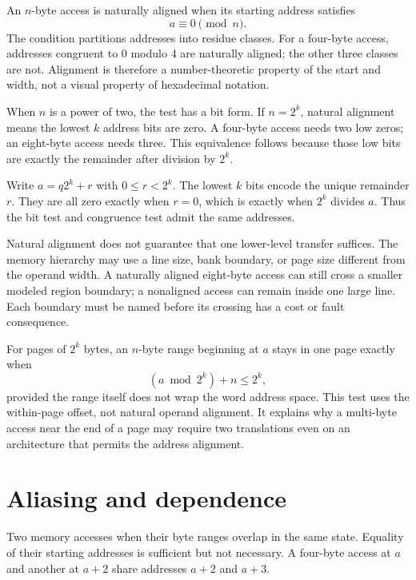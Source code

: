 An \(n\)-byte access is naturally aligned when its starting address satisfies
\[
 a\equiv0\pmod n.
\]
The condition partitions addresses into residue classes. For a four-byte
access, addresses congruent to 0 modulo 4 are naturally aligned; the other
three classes are not. Alignment is therefore a number-theoretic property of
the start and width, not a visual property of hexadecimal notation.

When \(n\) is a power of two, the test has a bit form. If \(n=2^k\), natural
alignment means the lowest \(k\) address bits are zero. A four-byte access
needs two low zeros; an eight-byte access needs three. This equivalence follows
because those low bits are exactly the remainder after division by \(2^k\).

\begin{proofkit}[title={Low zero bits characterize power-of-two alignment}]
Write \(a=q2^k+r\) with \(0\leq r<2^k\). The lowest \(k\) bits encode the
unique remainder \(r\). They are all zero exactly when \(r=0\), which is
exactly when \(2^k\) divides \(a\). Thus the bit test and congruence test admit
the same addresses.
\end{proofkit}

Natural alignment does not guarantee that one lower-level transfer suffices.
The memory hierarchy may use a line size, bank boundary, or page size different
from the operand width. A naturally aligned eight-byte access can still cross
a smaller modeled region boundary; a nonaligned access can remain inside one
large line. Each boundary must be named before its crossing has a cost or
fault consequence.

For pages of \(2^k\) bytes, an \(n\)-byte range beginning at \(a\) stays in
one page exactly when
\[
 (a\bmod2^k)+n\leq2^k,
\]
provided the range itself does not wrap the word address space. This test uses
the within-page offset, not natural operand alignment. It explains why a
multi-byte access near the end of a page may require two translations even on
an architecture that permits the address alignment.

\section{Aliasing and dependence}

Two memory accesses  when their byte ranges overlap in the same
state. Equality of their starting addresses is sufficient but not necessary.
A four-byte access at \(a\) and another at \(a+2\) share addresses \(a+2\) and
\(a+3\).

